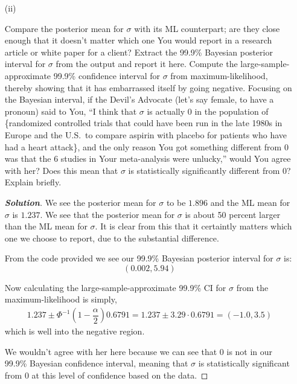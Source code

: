 \documentclass[12pt]{article}
\newcommand{\lrp}[1]{\left(#1\right)}
\newenvironment{solution}{\begin{tcolorbox}[breakable]\begin{proof}[\textbf{\textit{Solution}}] }{\end{proof}\end{tcolorbox}}
\begin{document}
\begin{itemize}
\begin{itemize}
\begin{solution}
\end{solution}

\item[(ii)]

Compare the posterior mean for $\sigma$ with its ML counterpart; are they close enough that it doesn't matter which one You would report in a research article or white paper for a client? \textit{\fbox{\textbf{[10 points]}}} Extract the 99.9\% Bayesian posterior interval for $\sigma$ from the output and report it here. \textit{\fbox{\textbf{[5 points]}}} Compute the large-sample-approximate 99.9\% confidence interval for $\sigma$ from maximum-likelihood, thereby showing that it has embarrassed itself by going negative. \textit{\fbox{\textbf{[5 points]}}} \vspace*{0.025in} Focusing on the Bayesian interval, if the Devil's Advocate (let's say female, to have a pronoun) said to You, ``I think that $\sigma$ is actually 0 in the population of \{randomized controlled trials that could have been run in the late 1980s in Europe and the U.S.~to compare aspirin with placebo for patients who have had a heart attack\}, and the only reason You got something different from 0 was that the 6 studies in Your meta-analysis were unlucky,'' would You agree with her? Does this mean that $\sigma$ is statistically significantly different from 0? Explain briefly. \textit{\fbox{\textbf{[10 points]}}}

\begin{solution}
    We see the posterior mean for $\sigma$ to be $1.896$ and the ML mean for $\sigma$ is $1.237$. We see that the posterior mean for $\sigma$ is about 50 percent larger than the ML mean for $\sigma$. It is clear from this that it certaintly matters which one we choose to report, due to the substantial difference.

    From the code provided we see our 99.9\% Bayesian posterior interval for $\sigma$ is:
    \[(0.002, 5.94)\]

    Now calculating the large-sample-approximate 99.9\% CI for $\sigma$ from the maximum-likelihood is simply,
    \begin{align*}
        1.237 \pm \Phi^{-1}\lrp{1 - \dfrac{\alpha}{2}}0.6791 = 1.237 \pm 3.29 \cdot 0.6791 = (-1.0, 3.5)
    \end{align*}
    which is well into the negative region. 

    We wouldn't agree with her here because we can see that 0 is not in our 99.9\% Bayesian confidence interval, meaning that $\sigma$ is statistically significant from 0 at this level of confidence based on the data. 



\end{solution}
\end{itemize}
\end{itemize}
\end{document}
